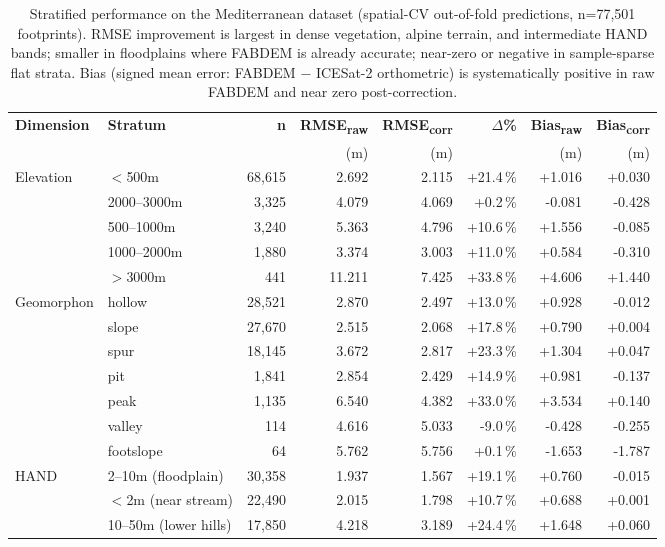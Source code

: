 \begin{table}[t]
\centering
\caption{Stratified performance on the Mediterranean dataset (spatial-CV out-of-fold predictions, n=77{,}501 footprints). RMSE improvement is largest in dense vegetation, alpine terrain, and intermediate HAND bands; smaller in floodplains where FABDEM is already accurate; near-zero or negative in sample-sparse flat strata. Bias (signed mean error: FABDEM $-$ ICESat-2 orthometric) is systematically positive in raw FABDEM and near zero post-correction.}
\label{tab:stratification}
\footnotesize
\begin{tabular}{llrrrrrr}
\toprule
\textbf{Dimension} & \textbf{Stratum} & \textbf{n} &
\textbf{RMSE\textsubscript{raw}} & \textbf{RMSE\textsubscript{corr}} &
\textbf{$\Delta$\%} & \textbf{Bias\textsubscript{raw}} & \textbf{Bias\textsubscript{corr}} \\
& & & (m) & (m) & & (m) & (m) \\
\midrule
Elevation & $<$500m & 68,615 & 2.692 & 2.115 & +21.4\,\% & +1.016 & +0.030 \\
 & 2000–3000m & 3,325 & 4.079 & 4.069 & +0.2\,\% & -0.081 & -0.428 \\
 & 500–1000m & 3,240 & 5.363 & 4.796 & +10.6\,\% & +1.556 & -0.085 \\
 & 1000–2000m & 1,880 & 3.374 & 3.003 & +11.0\,\% & +0.584 & -0.310 \\
 & $>$3000m & 441 & 11.211 & 7.425 & +33.8\,\% & +4.606 & +1.440 \\
\addlinespace[2pt]
Geomorphon & hollow & 28,521 & 2.870 & 2.497 & +13.0\,\% & +0.928 & -0.012 \\
 & slope & 27,670 & 2.515 & 2.068 & +17.8\,\% & +0.790 & +0.004 \\
 & spur & 18,145 & 3.672 & 2.817 & +23.3\,\% & +1.304 & +0.047 \\
 & pit & 1,841 & 2.854 & 2.429 & +14.9\,\% & +0.981 & -0.137 \\
 & peak & 1,135 & 6.540 & 4.382 & +33.0\,\% & +3.534 & +0.140 \\
 & valley & 114 & 4.616 & 5.033 & -9.0\,\% & -0.428 & -0.255 \\
 & footslope & 64 & 5.762 & 5.756 & +0.1\,\% & -1.653 & -1.787 \\
\addlinespace[2pt]
HAND & 2–10m (floodplain) & 30,358 & 1.937 & 1.567 & +19.1\,\% & +0.760 & -0.015 \\
 & $<$2m (near stream) & 22,490 & 2.015 & 1.798 & +10.7\,\% & +0.688 & +0.001 \\
 & 10–50m (lower hills) & 17,850 & 4.218 & 3.189 & +24.4\,\% & +1.648 & +0.060 \\

\end{tabular}
\end{table}
